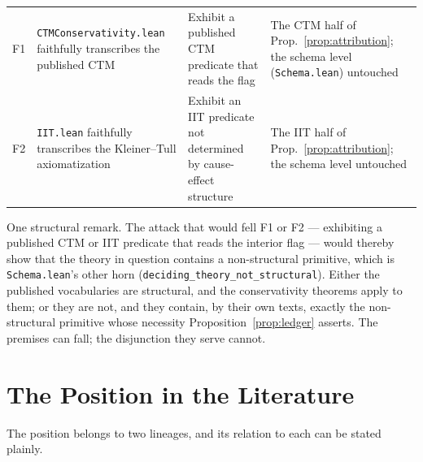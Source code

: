 \documentclass[11pt]{article}
\theoremstyle{remark}
\newcommand{\lf}[1]{\texttt{#1}}       %
\begin{document}
\begin{center}
\begin{tabular}{@{}lp{}p{}p{}@{}}
\addlinespace[2pt]
F1 & \lf{CTMConservativity.lean} faithfully transcribes the published CTM & Exhibit a published CTM predicate that reads the flag & The CTM half of Prop.~\ref{prop:attribution}; the schema level (\lf{Schema.lean}) untouched \\
\addlinespace[2pt]
F2 & \lf{IIT.lean} faithfully transcribes the Kleiner--Tull axiomatization & Exhibit an IIT predicate not determined by cause-effect structure & The IIT half of Prop.~\ref{prop:attribution}; the schema level untouched \\
\bottomrule
\end{tabular}
\end{center}

One structural remark. The attack that would fell F1 or F2 --- exhibiting a published CTM or IIT predicate that reads the interior flag --- would thereby show that the theory in question contains a non-structural primitive, which is \lf{Schema.lean}'s other horn (\lf{deciding\_theory\_not\_structural}). Either the published vocabularies are structural, and the conservativity theorems apply to them; or they are not, and they contain, by their own texts, exactly the non-structural primitive whose necessity Proposition~\ref{prop:ledger} asserts. The premises can fall; the disjunction they serve cannot.

\section{The Position in the Literature}\label{sec:related}

The position belongs to two lineages, and its relation to each can be stated plainly.
\end{document}
